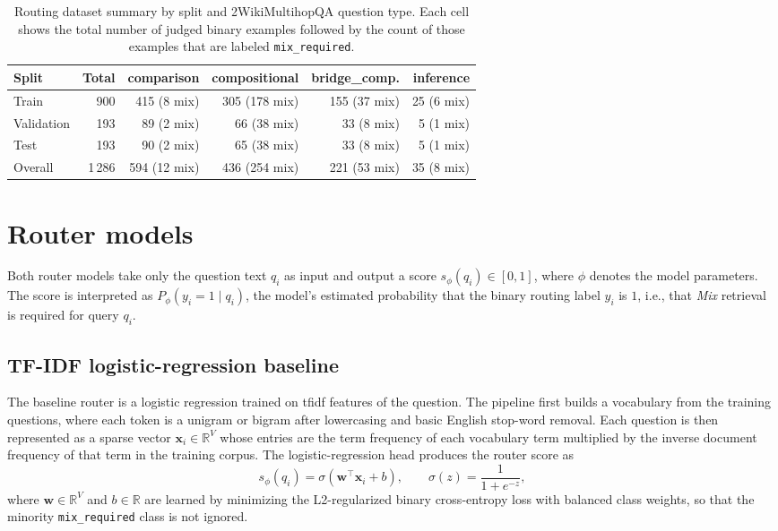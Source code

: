 \documentclass[english, bibtex]{kththesis}               %
\numberwithin{listing}{chapter}
\begin{document}
\begin{table}[!ht]
\begin{center}
\caption{Routing dataset summary by split and 2WikiMultihopQA question type. Each cell shows the total number of judged binary examples followed by the count of those examples that are labeled \texttt{mix\_required}.}
\label{tab:datasetSummary}
\begin{tabular}{l|r|rrrr}
\textbf{Split} & \textbf{Total} & \textbf{comparison} & \textbf{compositional} & \textbf{bridge\_comp.} & \textbf{inference} \\
\hline
Train & 900 & 415 (8 mix) & 305 (178 mix) & 155 (37 mix) & 25 (6 mix) \\
Validation & 193 & 89 (2 mix) & 66 (38 mix) & 33 (8 mix) & 5 (1 mix) \\
Test & 193 & 90 (2 mix) & 65 (38 mix) & 33 (8 mix) & 5 (1 mix) \\
\hline
Overall & 1\,286 & 594 (12 mix) & 436 (254 mix) & 221 (53 mix) & 35 (8 mix) \\
\end{tabular}
\end{center}
\end{table}

\section{Router models}
\label{sec:methodRouters}

Both router models take only the question text $q_i$ as input and output a score \(s_\phi(q_i) \in [0,1]\), where $\phi$ denotes the model parameters. The score is interpreted as $P_\phi(y_i = 1 \mid q_i)$, the model's estimated probability that the binary routing label $y_i$ is $1$, i.e., that \emph{Mix} retrieval is required for query $q_i$.

\subsection{TF-IDF logistic-regression baseline}
\label{sec:methodTfidf}

The baseline router is a logistic regression trained on \gls{tfidf} features of the question. The pipeline first builds a vocabulary from the training questions, where each token is a unigram or bigram after lowercasing and basic English stop-word removal. Each question is then represented as a sparse vector \(\mathbf{x}_i \in \mathbb{R}^{V}\) whose entries are the term frequency of each vocabulary term multiplied by the inverse document frequency of that term in the training corpus. The logistic-regression head produces the router score as
\begin{equation}
\label{eq:tfidfScore}
s_\phi(q_i) = \sigma(\mathbf{w}^\top \mathbf{x}_i + b),
\qquad
\sigma(z) = \frac{1}{1 + e^{-z}},
\end{equation}
where \(\mathbf{w} \in \mathbb{R}^{V}\) and \(b \in \mathbb{R}\) are learned by minimizing the L2-regularized binary cross-entropy loss with balanced class weights, so that the minority \texttt{mix\_required} class is not ignored.
\end{document}
